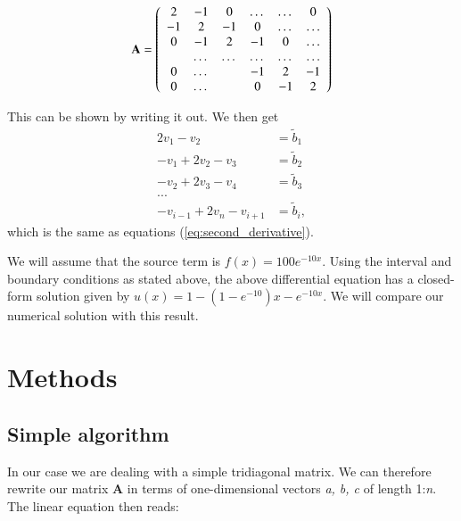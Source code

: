 \documentclass{article}
\begin{document}
\begin{multicols}{2}
\begin{equation}
    {\bf A} = \left(\begin{array}{cccccc}
                           2& -1& 0 &\dots   & \dots &0 \\
                           -1 & 2 & -1 &0 &\dots &\dots \\
                           0&-1 &2 & -1 & 0 & \dots \\
                           & \dots   & \dots &\dots   &\dots & \dots \\
                           0&\dots   &  &-1 &2& -1 \\
                           0&\dots    &  & 0  &-1 & 2 \\
                      \end{array} \right)
\end{equation}

\noindent This can be shown by writing it out. We then get
\begin{align}
	2v_1 - v_2 &= \tilde{b}_1 \\
	-v_1 + 2v_2 - v_3 &= \tilde{b}_2 \\
	-v_2 + 2v_3 - v_4 &= \tilde{b}_3 \\
	... \\
	-v_{i-1} + 2v_n - v_{i+1} &= \tilde{b}_i,
\end{align}
which is the same as equations (\ref{eq:second_derivative}).

\noindent We will assume that the source term is $f(x) = 100e^{-10x}$. Using the interval and boundary conditions as stated above, the above differential equation has a closed-form  solution given by $u(x) = 1-(1-e^{-10})x-e^{-10x}$. We will compare our numerical solution with this result. 





\section{Methods}
\subsection{Simple algorithm}
In our case we are dealing with a simple tridiagonal matrix. We can therefore rewrite our matrix \textbf{A} in terms of one-dimensional vectors \textit{a, b, c} of length 1:\textit{n}. The linear equation then reads:


\end{multicols}
\end{document}
